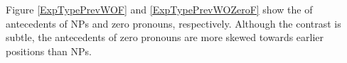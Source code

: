 Figure \ref{ExpTypePrevWOF} and \ref{ExpTypePrevWOZeroF} show the  of antecedents of NPs and zero pronouns, respectively.
Although the contrast is subtle,
the antecedents of zero pronouns are more skewed towards earlier positions than NPs.

